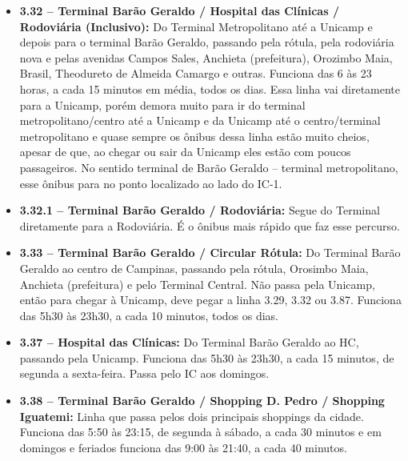 \begin{itemize}
\item  \textbf{3.32 -- Terminal Barão Geraldo / Hospital das Clínicas / Rodoviária (Inclusivo):} Do Terminal Metropolitano até a Unicamp e depois para o terminal Barão Geraldo, passando pela rótula, pela rodoviária nova e pelas avenidas Campos Sales, Anchieta (prefeitura), Orozimbo Maia, Brasil, Theodureto de Almeida Camargo e outras. Funciona das 6 às 23 horas, a cada 15 minutos em média, todos os dias. Essa linha vai diretamente para a Unicamp, porém demora muito para ir do terminal metropolitano/centro até a Unicamp e da Unicamp até o centro/terminal metropolitano e quase sempre os ônibus dessa linha estão muito cheios, apesar de que, ao chegar ou sair da Unicamp eles estão com poucos passageiros. No sentido terminal de Barão Geraldo -- terminal metropolitano, esse ônibus para no ponto localizado ao lado do IC-1.
\end{itemize}

\begin{itemize}
\item  \textbf{3.32.1 -- Terminal Barão Geraldo / Rodoviária:} Segue do Terminal
diretamente para a Rodoviária. É o ônibus mais rápido que faz esse percurso.
\end{itemize}

\begin{itemize}
\item  \textbf{3.33 -- Terminal Barão Geraldo / Circular Rótula:} Do Terminal Barão Geraldo ao centro de Campinas, passando pela rótula, Orosimbo Maia, Anchieta (prefeitura) e pelo Terminal Central. Não passa pela Unicamp, então para chegar à Unicamp, deve pegar a linha 3.29, 3.32 ou 3.87. Funciona das 5h30 às 23h30, a cada 10 minutos, todos os dias.
\end{itemize}

\begin{itemize}
\item  \textbf{3.37 -- Hospital das Clínicas:} Do Terminal Barão Geraldo ao HC, passando pela Unicamp. Funciona das 5h30 às 23h30, a cada 15 minutos, de segunda a sexta-feira. Passa pelo IC aos domingos.
\end{itemize}

\begin{itemize}
\item  \textbf{3.38 -- Terminal Barão Geraldo / Shopping D. Pedro / Shopping Iguatemi:} Linha que passa pelos dois principais shoppings da cidade. Funciona das 5:50 às 23:15, de segunda à sábado, a cada 30 minutos e em domingos e feriados funciona das 9:00 às 21:40, a cada 40 minutos.
\end{itemize}

